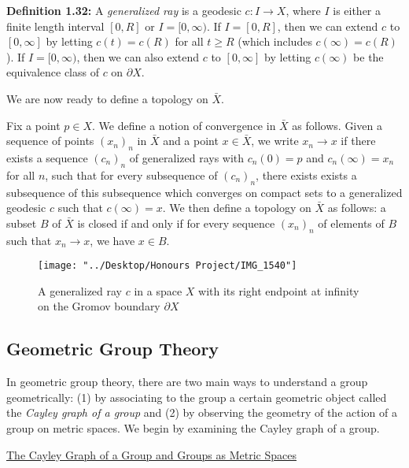 \documentclass[12pt]{article}
\newcommand{\vs}{\vskip10pt}
\begin{document}
	\vs 
	
	\textbf{Definition 1.32: } A \textit{generalized ray} is a geodesic $c: I \rightarrow X$, where $I$ is either a finite length interval $[0, R]$ or $I = [0, \infty)$. If $I = [0, R]$, then we can extend $c$ to $[0, \infty]$ by letting $c(t) = c(R)$ for all $t \geq R$ (which includes $c(\infty) = c(R)$). If $I = [0, \infty)$, then we can also extend $c$ to $[0, \infty]$ by letting $c(\infty)$ be the equivalence class of $c$ on $\partial X$. 
	
	\vs 
	
	We are now ready to define a topology on $\bar{X}$. 
	
	\vs 
	
	Fix a point $p \in X$. We define a notion of convergence in $\bar{X}$ as follows. Given a sequence of points $(x_n)_{n}$ in $\bar{X}$ and a point $x \in \bar{X}$, we write $x_n \rightarrow x$ if there exists a sequence $(c_n)_n$ of generalized rays with $c_n(0) = p$ and $c_n(\infty) = x_n$ for all $n$, such that for every subsequence of $(c_n)_n$, there exists exists a subsequence of this subsequence which converges on compact sets to a generalized geodesic $c$ such that $c(\infty) = x$. We then define a topology on $\bar{X}$ as follows: a subset $B$ of $\bar{X}$ is closed if and only if for every sequence $(x_n)_n$ of elements of $B$ such that $x_n \rightarrow x$, we have $x \in B$. 
	
	\vs
	
\begin{figure} [H]
	\centering
	\texttt{[image: "../Desktop/Honours Project/IMG\_1540"]}
	\caption{A generalized ray $c$ in a space $X$ with its right endpoint at infinity on the Gromov boundary $\partial X$}
	\label{fig:img1540}
\end{figure}
		
		
		\newpage
	\subsection{Geometric Group Theory}
	
	In geometric group theory, there are two main ways to understand a group geometrically: (1) by associating to the group a certain geometric object called the \textit{Cayley graph of a group} and (2) by observing the geometry of the action of a group on metric spaces. We begin by examining the Cayley graph of a group. 
	
	\vs 
	
	\underline{The Cayley Graph of a Group and Groups as Metric Spaces}
	
\end{document}

